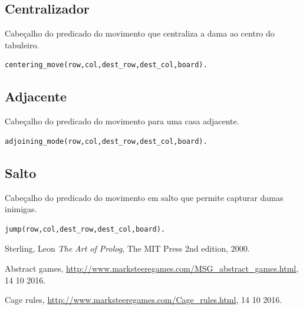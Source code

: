\documentclass[a4paper,11pt,titlepage]{article}
\begin{document}
\subsection{Centralizador}
Cabeçalho do predicado do movimento que centraliza a dama ao centro do tabuleiro.
\begin{verbatim}
centering_move(row,col,dest_row,dest_col,board).
\end{verbatim}

\subsection{Adjacente}
Cabeçalho do predicado do movimento para uma casa adjacente.
\begin{verbatim}
adjoining_mode(row,col,dest_row,dest_col,board).
\end{verbatim}

\subsection{Salto}
Cabeçalho do predicado do movimento em salto que permite capturar damas inimigas.
\begin{verbatim}
jump(row,col,dest_row,dest_col,board).
\end{verbatim}


\begin{thebibliography}{9}
  Sterling, Leon
  \emph{The Art of Prolog},
  The MIT Press
  2nd edition,
  2000.
  
  Abstract games,
  \url{http://www.marksteeregames.com/MSG_abstract_games.html}, 14 10 2016.
  
  Cage rules,
  \url{http://www.marksteeregames.com/Cage_rules.html}, 14 10 2016.
\end{thebibliography}
\end{document}
